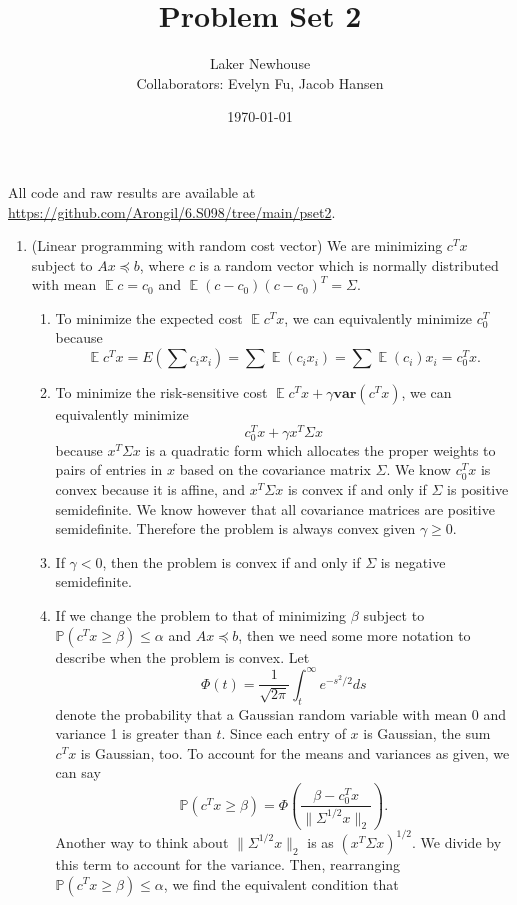 \documentclass{article}
\title{Problem Set 2}
\author{Laker Newhouse\\Collaborators: Evelyn Fu, Jacob Hansen}
\date{\today}
\renewcommand{\P}{\mathbb{P}}
\DeclareMathOperator{\E}{\mathbb{E}}
\begin{document}
\maketitle	

All code and raw results are available at \url{https://github.com/Arongil/6.S098/tree/main/pset2}.
\begin{enumerate}
    \item (Linear programming with random cost vector) We are minimizing $c^T x$ subject to $Ax \preceq b$, where $c$ is a random vector which is normally distributed with mean $\E c = c_0$ and $\E(c - c_0)(c - c_0)^T = \Sigma$. \begin{enumerate}
        \item To minimize the expected cost $\E c^T x$, we can equivalently minimize $c_0^T$ because \[
            \E c^T x = E \left( \sum c_i x_i \right) = \sum \E(c_i x_i) = \sum \E(c_i) x_i = c_0^T x.    
        \]
        \item To minimize the risk-sensitive cost $\E c^T x + \gamma \mathbf{var}(c^T x)$, we can equivalently minimize \[
            c_0^T x + \gamma x^T \Sigma x
        \] because $x^T \Sigma x$ is a quadratic form which allocates the proper weights to pairs of entries in $x$ based on the covariance matrix $\Sigma$. We know $c_0^T x$ is convex because it is affine, and $x^T \Sigma x$ is convex if and only if $\Sigma$ is positive semidefinite. We know however that all covariance matrices are positive semidefinite. Therefore the problem is always convex given $\gamma \geq 0$.
        \item If $\gamma < 0$, then the problem is convex if and only if $\Sigma$ is negative semidefinite.
        \item If we change the problem to that of minimizing $\beta$ subject to $\P(c^T x \geq \beta) \leq \alpha$ and $Ax \preceq b$, then we need some more notation to describe when the problem is convex. Let \[
        \Phi(t) = \frac{1}{\sqrt{2\pi}} \int_t^\infty e^{-s^2/2} ds
    \] denote the probability that a Gaussian random variable with mean 0 and variance 1 is greater than $t$. Since each entry of $x$ is Gaussian, the sum $c^T x$ is Gaussian, too. To account for the means and variances as given, we can say \[
        \P(c^T x \geq \beta) = \Phi\left( \frac{\beta - c_0^T x}{\|\Sigma^{1/2} x\|_2} \right).
    \] Another way to think about $\|\Sigma^{1/2} x\|_2$ is as $(x^T \Sigma x)^{1/2}$. We divide by this term to account for the variance. Then, rearranging $\P(c^T x \geq \beta) \leq \alpha$, we find the equivalent condition that \[
\]
\end{enumerate}
\end{enumerate}
\end{document}
